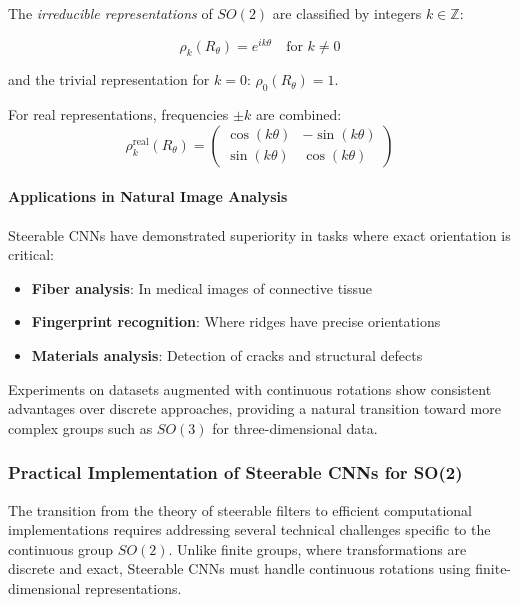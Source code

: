 \begin{definition}\label{def:irreps_so2}
The \textit{irreducible representations} of $SO(2)$ are classified by integers $k \in \mathbb{Z}$:

\begin{equation}
\rho_k(R_\theta) = e^{ik\theta} \quad \text{for } k \neq 0
\end{equation}

and the trivial representation for $k = 0$: $\rho_0(R_\theta) = 1$.

For real representations, frequencies $\pm k$ are combined:
\begin{equation}
\rho_k^{\text{real}}(R_\theta) = \begin{pmatrix}
\cos(k\theta) & -\sin(k\theta) \\
\sin(k\theta) & \cos(k\theta)
\end{pmatrix}
\end{equation}
\end{definition}

\paragraph{Applications in Natural Image Analysis}

Steerable CNNs have demonstrated superiority in tasks where exact orientation is critical:

\begin{itemize}
    \item \textbf{Fiber analysis}: In medical images of connective tissue
    \item \textbf{Fingerprint recognition}: Where ridges have precise orientations
    \item \textbf{Materials analysis}: Detection of cracks and structural defects
\end{itemize}

Experiments on datasets augmented with continuous rotations show consistent advantages over discrete approaches, providing a natural transition toward more complex groups such as $SO(3)$ for three-dimensional data.

\subsubsection{Practical Implementation of Steerable CNNs for SO(2)}\label{subsubsec:implementacion_steerable_cnns}

The transition from the theory of steerable filters to efficient computational implementations requires addressing several technical challenges specific to the continuous group $SO(2)$. Unlike finite groups, where transformations are discrete and exact, Steerable CNNs must handle continuous rotations using finite-dimensional representations.

